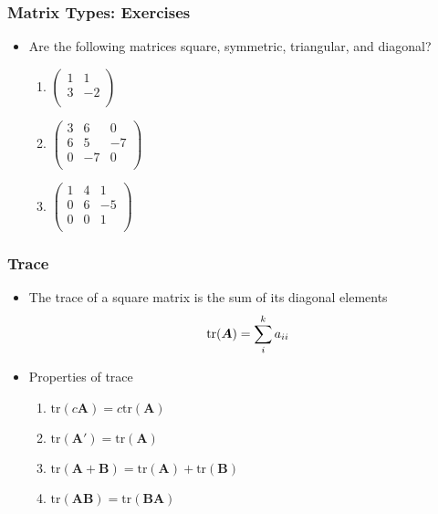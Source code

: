 \documentclass[pdflatex, 12pt]{beamer}
\begin{document}
\begin{frame}
\frametitle{Matrix Types: Exercises}
\begin{itemize}
\item Are the following matrices square, symmetric, triangular, and diagonal?  
 \begin{enumerate}
 \item $\begin{pmatrix}
 1 & 1 \\
 3 & -2 \\
 \end{pmatrix}$
 \vspace{0.2cm}
 \item $\begin{pmatrix}
 3 & 6 & 0 \\
 6 & 5 & -7 \\
 0 & -7 & 0 \\
 \end{pmatrix}$
 \vspace{0.2cm}
 \item $\begin{pmatrix}
 1 & 4 & 1 \\
 0 & 6 & -5 \\
 0 & 0 & 1 \\
 \end{pmatrix}$
 \end{enumerate}
\end{itemize}
\end{frame}

\begin{frame}
\frametitle{Trace}
\begin{itemize}
\item The trace of a square matrix is the sum of its diagonal elements
 \begin{equation}
 \mathrm{tr}(\bm{A}) = \sum_i^k a_{ii} \notag
 \end{equation}
\item Properties of trace
 \begin{enumerate}
 \item $\mathrm{tr}(c\bm{A}) = c\mathrm{tr}(\bm{A})$
 \item $\mathrm{tr}(\bm{A}') = \mathrm{tr}(\bm{A})$
 \item $\mathrm{tr}(\bm{A} + \bm{B}) = \mathrm{tr}(\bm{A}) + \mathrm{tr}(\bm{B})$
 \item $\mathrm{tr}(\bm{AB}) = \mathrm{tr}(\bm{BA})$
 \end{enumerate}
\end{itemize}
\end{frame}
\end{document}
